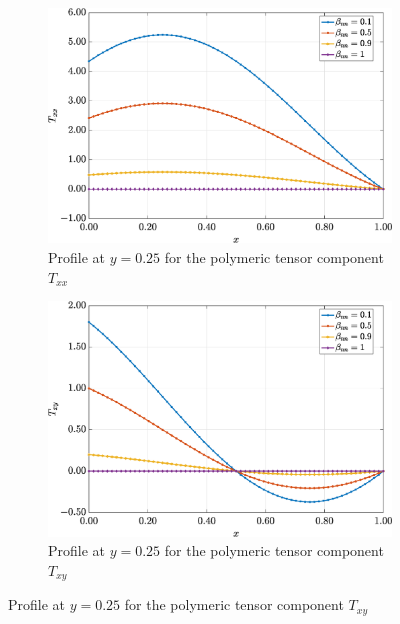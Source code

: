 \documentclass[preprint, 12pt]{elsarticle}
\begin{document}
\begin{figure}[H]
    \centering
    \begin{subfigure}[b]{.46\textwidth}
        \includegraphics[width=\textwidth]{Slice_y_Tog_Numerical_NormErr_2nd_Betann_1_Re_1000_Wi_1_epsilon_0_xi_0_alphaG_0.5_Dt_1e-06_at_0.05_tipsim_1_MMS_12_x0.25y0.25_Txx.eps}
        \caption{Profile at $y=0.25$ for the polymeric tensor component $T_{xx}$}
        \label{fig_slice_y_txx_2nd_Case1_giesekus_y025}
    \end{subfigure}
    \vspace{0.2cm}
    \qquad
    \begin{subfigure}[b]{.46\textwidth}
        \includegraphics[width=\textwidth]{Slice_y_Tog_Numerical_NormErr_2nd_Betann_1_Re_1000_Wi_1_epsilon_0_xi_0_alphaG_0.5_Dt_1e-06_at_0.05_tipsim_1_MMS_12_x0.25y0.25_Txy.eps}
        \caption{Profile at $y=0.25$ for the polymeric tensor component $T_{xy}$}

\end{subfigure}
\end{figure}
\end{document}

